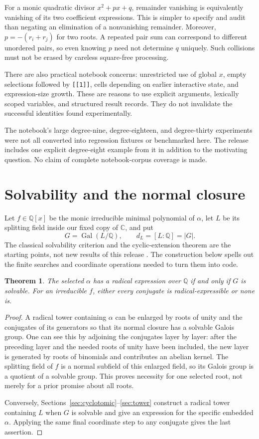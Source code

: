 \documentclass[11pt,a4paper]{article}
\newcommand{\Q}{\mathbb Q}
\newcommand{\C}{\mathbb C}
\newcommand{\Gal}{\operatorname{Gal}}
\newcommand{\code}[1]{\texttt{\small #1}}
\newtheorem{theorem}{Theorem}[section]
\theoremstyle{definition}
\begin{document}
For a monic quadratic divisor $x^2+px+q$, remainder vanishing is equivalently
vanishing of its two coefficient expressions. This is simpler to specify and
audit than negating an elimination of a nonvanishing remainder. Moreover,
$p=-(r_i+r_j)$ for two roots. A repeated pair sum can correspond to different
unordered pairs, so even knowing $p$ need not determine $q$ uniquely. Such
collisions must not be erased by careless square-free processing.

There are also practical notebook concerns: unrestricted use of global $x$,
empty selections followed by \code{[[1]]}, cells depending on earlier interactive
state, and expression-size growth. These are reasons to use explicit arguments,
lexically scoped variables, and structured result records. They do not invalidate
the successful identities found experimentally.

The notebook's large degree-nine, degree-eighteen, and degree-thirty experiments
were not all converted into regression fixtures or benchmarked here. The release
includes one explicit degree-eight example from it in addition to the motivating
question. No claim of complete notebook-corpus coverage is made.

\section{Solvability and the normal closure}
Let $f\in\Q[x]$ be the monic irreducible minimal polynomial of $\alpha$, let $L$
be its splitting field inside our fixed copy of $\C$, and put
\[
 G=\Gal(L/\Q),\qquad d_L=[L:\Q]=|G|.
\]
The classical solvability criterion and the cyclic-extension theorem are the
starting points, not new results of this release \cite[Prop.~5.27,
Thm.~5.34]{milne}. The construction below spells out the finite searches and
coordinate operations needed to turn them into code.

\begin{theorem}\label{thm:criterion}
The selected $\alpha$ has a radical expression over $\Q$ if and only if $G$ is
solvable. For an irreducible $f$, either every conjugate is radical-expressible or
none is.
\end{theorem}
\begin{proof}
A radical tower containing $\alpha$ can be enlarged by roots of unity and the
conjugates of its generators so that its normal closure has a solvable Galois
group. One can see this by adjoining the conjugates layer by layer: after the
preceding layer and the needed roots of unity have been included, the new layer
is generated by roots of binomials and contributes an abelian kernel. The
splitting field of $f$ is a normal subfield of this enlarged field, so its Galois
group is a quotient of a solvable group. This proves necessity for one selected
root, not merely for a prior promise about all roots.

Conversely, Sections~\ref{sec:cyclotomic}--\ref{sec:tower} construct a radical
tower containing $L$ when $G$ is solvable and give an expression for the specific
embedded $\alpha$. Applying the same final coordinate step to any conjugate
gives the last assertion.
\end{proof}
\end{document}
